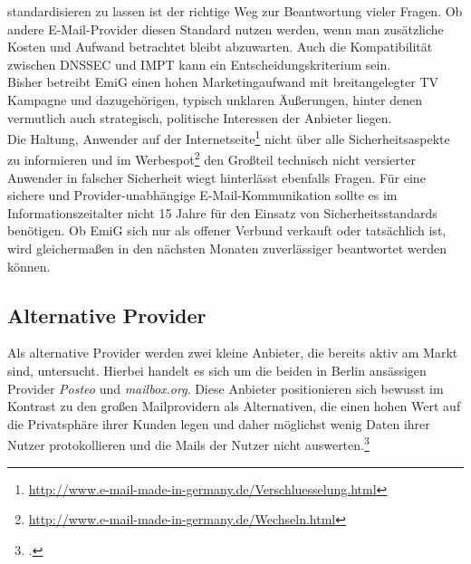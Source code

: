 \documentclass  [paper=a4,
				fontsize=12pt,
				listof=totoc,
				bibliography=totoc
				]{scrreprt}
\begin{document}
			standardisieren zu lassen ist der richtige Weg zur Beantwortung vieler Fragen.
			Ob andere E-Mail-Provider diesen Standard nutzen werden, wenn man zusätzliche Kosten und Aufwand betrachtet bleibt abzuwarten. Auch die Kompatibilität zwischen DNSSEC und IMPT kann ein Entscheidungskriterium sein.
			\medskip\\
			Bisher betreibt EmiG einen hohen Marketingaufwand mit breitangelegter TV Kampagne und dazugehörigen, typisch unklaren Äußerungen, hinter denen vermutlich auch strategisch, politische Interessen der Anbieter liegen.\\
			Die Haltung, Anwender auf der Internetseite\footnote{\url{http://www.e-mail-made-in-germany.de/Verschluesselung.html}} 
			nicht über alle Sicherheitsaspekte zu informieren und im Werbespot\footnote{\url{http://www.e-mail-made-in-germany.de/Wechseln.html}} den Großteil technisch nicht versierter Anwender in falscher Sicherheit wiegt hinterlässt ebenfalls Fragen.
			Für eine sichere und Provider-unabhängige E-Mail-Kommunikation sollte es im Informationszeitalter nicht 15 Jahre für den Einsatz von Sicherheitsstandards benötigen.
			Ob EmiG sich nur als offener Verbund verkauft oder tatsächlich ist, wird gleichermaßen in den nächsten Monaten zuverlässiger beantwortet werden können.

			\subsection{Alternative Provider}
			Als alternative Provider werden zwei kleine Anbieter, die bereits aktiv am Markt sind, untersucht.
			Hierbei handelt es sich um die beiden in Berlin ansässigen Provider \textit{Posteo} und \textit{mailbox.org}.
			Diese Anbieter positionieren sich bewusst im Kontrast zu den großen Mailprovidern als Alternativen, die einen hohen Wert auf die Privatsphäre ihrer Kunden legen und daher möglichst wenig Daten ihrer Nutzer protokollieren und die Mails der Nutzer nicht auswerten.\footcite[Vgl.][]{Posteo2013a, Mailbox2014}
			
\end{document}
